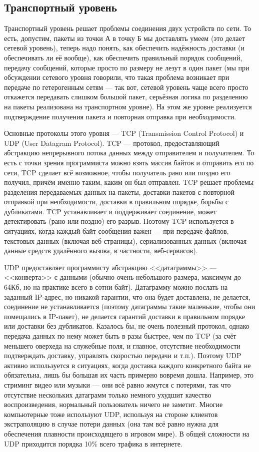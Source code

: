 \documentclass[a5paper]{article}
\begin{document}
\subsection{Транспортный уровень}

Транспортный уровень решает проблемы соединения двух устройств по сети. То есть, допустим, пакеты из точки А в точку Б мы доставлять умеем (это делает сетевой уровень), теперь надо понять, как обеспечить надёжность доставки (и обеспечивать ли её вообще), как обеспечить правильный порядок сообщений, передачу сообщений, которые просто по размеру не лезут в один пакет (мы при обсуждении сетевого уровня говорили, что такая проблема возникает при передаче по гетерогенным сетям --- так вот, сетевой уровень чаще всего просто откажется передавать слишком большой пакет, серьёзная логика по разделению на пакеты реализована на транспортном уровне). На этом же уровне реализуется подтверждение получения пакета и повторная отправка при необходимости.

Основные протоколы этого уровня --- TCP (Transmission Control Protocol) и UDP (User Datagram Protocol). TCP --- протокол, предоставляющий абстракцию непрерывного потока данных между отправителем и получателем. То есть с точки зрения программиста можно взять массив байтов и отправить его по сети, TCP сделает всё возможное, чтобы получатель рано или поздно его получил, причём именно таким, каким он был отправлен. TCP решает проблемы разделения передаваемых данных на пакеты, доставки пакетов с повторной отправкой при необходимости, доставки в правильном порядке, борьбы с дубликатами. TCP устанавливает и поддерживает соединение, может детектировать (рано или поздно) его разрыв. Поэтому TCP используется в ситуациях, когда каждый байт сообщения важен --- при передаче файлов, текстовых данных (включая веб-страницы), сериализованных данных (включая данные средств удалённого вызова, в частности, веб-сервисов).

UDP предоставляет программисту абстракцию <<датаграммы>> --- <<конверта>> с данными (обычно очень небольшого размера, максимум до 64Кб, но на практике всего в сотни байт). Датаграмму можно послать на заданный IP-адрес, но никакой гарантии, что она будет доставлена, не делается, соединение не устанавливается (поэтому датаграммы такие маленькие, чтобы они помещались в IP-пакет), не делается гарантий доставки в правильном порядке или доставки без дубликатов. Казалось бы, не очень полезный протокол, однако передача данных по нему может быть в разы быстрее, чем по TCP (за счёт меньшего оверхеда на служебные поля, и главное, отсутствие необходимости подтверждать доставку, управлять скоростью передачи и т.п.). Поэтому UDP активно используется в ситуациях, когда доставка каждого конкретного байта не обязательна, лишь бы большая их часть примерно вовремя дошла. Например, это стриминг видео или музыки --- они всё равно жмутся с потерями, так что отсутствие нескольких датаграмм только немного ухудшит качество воспроизведения, нормальный пользователь ничего не заметит. Многие компьютерные тоже используют UDP, используя на стороне клиентов экстраполяцию в случае потери данных (она там всё равно нужна для обеспечения плавности происходящего в игровом мире). В общей сложности на UDP приходится порядка 10\% всего трафика в интернете.
\end{document}
